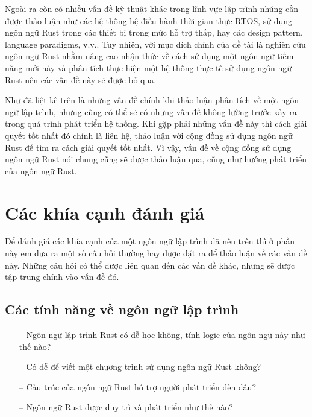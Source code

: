 Ngoài ra còn có nhiều vấn đề kỹ thuật khác trong lĩnh vực lập trình nhúng cần được thảo luận như các hệ thống hệ điều hành thời gian thực RTOS, sử dụng ngôn ngữ Rust trong các thiết bị trong mức hỗ trợ thấp, hay các design pattern, language paradigms, v.v..
Tuy nhiên, với mục đích chính của đề tài là nghiên cứu ngôn ngữ Rust nhằm nâng cao nhận thức về cách sử dụng một ngôn ngữ tiềm năng mới này và phân tích thực hiện một hệ thống thực tế sử dụng ngôn ngữ Rust nên các vấn đề này sẽ được bỏ qua.

Như đã liệt kê trên là những vấn đề chính khi thảo luận phân tích về một ngôn ngữ lập trình, nhưng cũng có thể sẽ có những vấn đề không lường trước xảy ra trong quá trình phát triển hệ thống.
Khi gặp phải những vấn đề này thì cách giải quyết tốt nhất đó chính là liên hệ, thảo luận với cộng đồng sử dụng ngôn ngữ Rust để tìm ra cách giải quyết tốt nhất.
Vì vậy, vấn đề về cộng đồng sử dụng ngôn ngữ Rust nói chung cũng sẽ được thảo luận qua, cũng như hướng phát triển của ngôn ngữ Rust.

\section{Các khía cạnh đánh giá}\label{lbl:quality}
Để đánh giá các khía cạnh của một ngôn ngữ lập trình đã nêu trên thì ở phần này em đưa ra một số câu hỏi thường hay được đặt ra để thảo luận về các vấn đề này. Những câu hỏi có thể được liên quan đến các vấn đề khác, nhưng sẽ được tập trung chính vào vấn đề đó.
\subsection{Các tính năng về ngôn ngữ lập trình}
\begin{itemize}
    \item[--] Ngôn ngữ lập trình Rust có dễ học không, tính logic của ngôn ngữ này như thế nào?
    \item[--] Có dễ để viết một chương trình sử dụng ngôn ngữ Rust không?
    \item[--] Cấu trúc của ngôn ngữ Rust hỗ trợ người phát triển đến đâu?
    \item[--] Ngôn ngữ Rust được duy trì và phát triển như thế nào?
\end{itemize}

